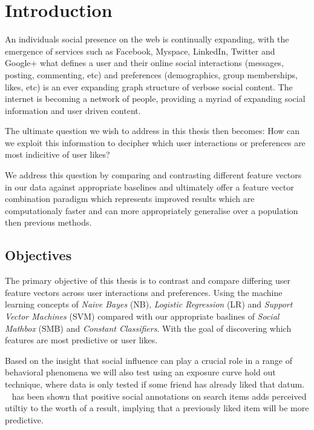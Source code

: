 
\chapter{Introduction}
\label{cha:intro}

An individuals social presence on the web is continually expanding, with the emergence of services such as Facebook, Myspace, LinkedIn, Twitter 
and Google+ what defines a user and their online social interactions (messages, posting, commenting, etc) and preferences 
(demographics, group memberships, likes, etc) is an ever expanding graph structure of verbose social content. The internet is becoming a network 
of people, providing a myriad of expanding social information and user driven content.

The ultimate question we wish to address in this thesis then becomes: 
How can we exploit this information to decipher which user interactions or preferences are most indicitive of user likes? 

We address this question by comparing and contrasting different feature vectors in our data against appropriate baselines and 
ultimately offer a feature vector combination paradigm which represents improved results which are computationaly faster and can more 
appropriately generalise over a population then previous methods.

\section{Objectives}
\label{sec:objectives}

The primary objective of this thesis is to contrast and compare differing user feature vectors across user interactions and preferences. 
Using the machine learning concepts of \emph{Naive Bayes} (NB), \emph{Logistic Regression} (LR) and \emph{Support Vector Machines} (SVM) compared with our 
appropriate baslines of \emph{Social Mathbox} (SMB) and \emph{Constant Classifiers}. With the goal of discovering which features are most predictive 
or user likes.

Based on the insight that social inﬂuence can play a crucial role in a range of behavioral phenomena \cite{grano,watts} we will also test 
using an exposure curve \cite{Romero2011hashtag} hold out technique, where data is only tested if some friend has already liked that 
datum. ~\cite{pantel} has been shown that positive social annotations on search items adds perceived utiltiy to the worth of a result, 
implying that a previously liked item will be more predictive.

